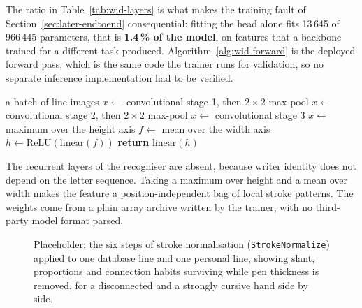 The ratio in Table~\ref{tab:wid-layers} is what makes the training fault of Section~\ref{sec:later-endtoend} consequential: fitting the head alone fits 13\,645 of 966\,445 parameters, that is \textbf{1.4\,\% of the model}, on features that a backbone trained for a different task produced. Algorithm~\ref{alg:wid-forward} is the deployed forward pass, which is the same code the trainer runs for validation, so no separate inference implementation had to be verified.

\begin{algorithm}[!htbp]
\caption{Deployed forward pass of both writer classifiers}
\label{alg:wid-forward}
\begin{algorithmic}[1]
\REQUIRE a batch of line images
\STATE $x\leftarrow$ convolutional stage 1, then $2\times2$ max-pool
\STATE $x\leftarrow$ convolutional stage 2, then $2\times2$ max-pool
\STATE $x\leftarrow$ convolutional stage 3 
\STATE $x\leftarrow$ maximum over the height axis 
\STATE $f\leftarrow$ mean over the width axis 
\STATE $h\leftarrow\mathrm{ReLU}(\mathrm{linear}(f))$ 
\STATE \textbf{return} $\mathrm{linear}(h)$ 
\end{algorithmic}
\end{algorithm}

The recurrent layers of the recogniser are absent, because writer identity does not depend on the letter sequence. Taking a maximum over height and a mean over width makes the feature a position-independent bag of local stroke patterns. The weights come from a plain array archive written by the trainer, with no third-party model format parsed.

\begin{figure}[htb]
\centering
{}
\captionsetup{singlelinecheck=false,justification=justified}
\caption{Placeholder: the six steps of stroke normalisation (\texttt{StrokeNormalize}) applied to one database line and one personal line, showing slant, proportions and connection habits surviving while pen thickness is removed, for a disconnected and a strongly cursive hand side by side.}
\label{fig:wid-snorm-fig}
\end{figure}

